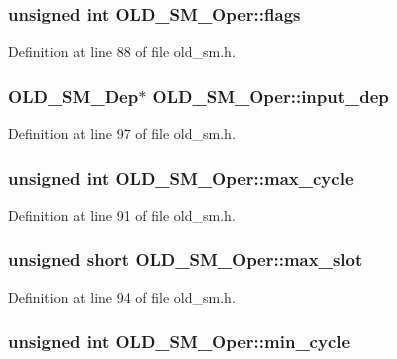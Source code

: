 \subsubsection{\setlength{\rightskip}{0pt plus 5cm}unsigned int \bf{OLD\_\-SM\_\-Oper::flags}}\label{structOLD__SM__Oper_ad9cb1d97701ed47c0b435b03c8033de}




Definition at line 88 of file old\_\-sm.h.
\subsubsection{\setlength{\rightskip}{0pt plus 5cm}\bf{OLD\_\-SM\_\-Dep}$\ast$ \bf{OLD\_\-SM\_\-Oper::input\_\-dep}}\label{structOLD__SM__Oper_d8a2365b978ee44fbe095ed62e9f17d7}




Definition at line 97 of file old\_\-sm.h.
\subsubsection{\setlength{\rightskip}{0pt plus 5cm}unsigned int \bf{OLD\_\-SM\_\-Oper::max\_\-cycle}}\label{structOLD__SM__Oper_48783ef0f93ef5784ff3beea37caa483}




Definition at line 91 of file old\_\-sm.h.
\subsubsection{\setlength{\rightskip}{0pt plus 5cm}unsigned short \bf{OLD\_\-SM\_\-Oper::max\_\-slot}}\label{structOLD__SM__Oper_66348c62d24bc8cd208eda00f6370e3b}




Definition at line 94 of file old\_\-sm.h.
\subsubsection{\setlength{\rightskip}{0pt plus 5cm}unsigned int \bf{OLD\_\-SM\_\-Oper::min\_\-cycle}}\label{structOLD__SM__Oper_d44178146aeaedc96dc0960704bbe19b}




